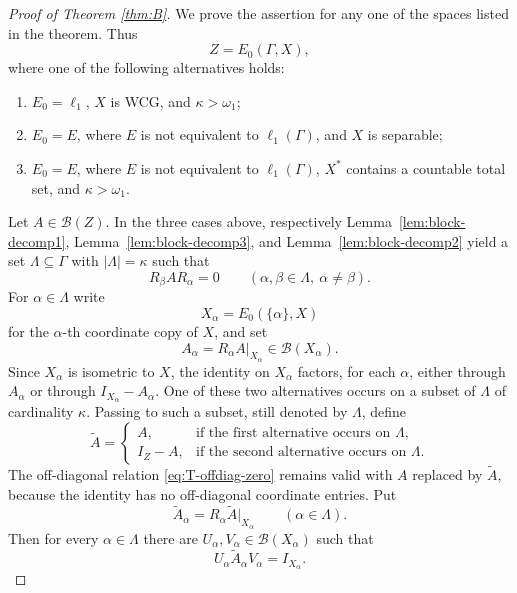 \documentclass[11pt]{amsart}
\theoremstyle{plain}
\theoremstyle{definition}
\numberwithin{equation}{section}
\newcommand{\abs}[1]{\left|#1\right|}
\newcommand{\Bop}{\mathcal{B}}
\begin{document}
\begin{proof}[Proof of Theorem \ref{thm:B}]
We prove the assertion for any one of the spaces listed in the theorem.  Thus
\[
    Z=E_0(\Gamma,X),
\]
where one of the following alternatives holds:
\begin{enumerate}[label=\textup{(\alph*)}]
    \item $E_0=\ell_1$, $X$ is WCG, and $\kappa>\omega_1$;
    \item $E_0=E$, where $E$ is not equivalent to $\ell_1(\Gamma)$, and $X$ is separable;
    \item $E_0=E$, where $E$ is not equivalent to $\ell_1(\Gamma)$, $X^*$ contains a countable total set, and $\kappa>\omega_1$.
\end{enumerate}
Let $A\in\Bop(Z)$.  In the three cases above, respectively Lemma~\ref{lem:block-decomp1}, Lemma~\ref{lem:block-decomp3}, and Lemma~\ref{lem:block-decomp2} yield a set $\Lambda\subseteq\Gamma$ with $\abs{\Lambda}=\kappa$ such that
\begin{equation}\label{eq:T-offdiag-zero}
    R_\beta A R_\alpha=0
    \qquad(\alpha,\beta\in\Lambda,\ \alpha\neq\beta).
\end{equation}
For $\alpha\in\Lambda$ write
\[
    X_\alpha=E_0(\{\alpha\},X)
\]
for the $\alpha$-th coordinate copy of $X$, and set
\[
    A_\alpha=R_\alpha A|_{X_\alpha}\in\Bop(X_\alpha).
\]
Since $X_\alpha$ is isometric to $X$, the identity on $X_\alpha$ factors, for each $\alpha$, either through $A_\alpha$ or through $I_{X_\alpha}-A_\alpha$.  One of these two alternatives occurs on a subset of $\Lambda$ of cardinality $\kappa$.  Passing to such a subset, still denoted by $\Lambda$, define
\[
    \widetilde A=
    \begin{cases}
        A, & \text{if the first alternative occurs on }\Lambda,\\
        I_Z-A, & \text{if the second alternative occurs on }\Lambda.
    \end{cases}
\]
The off-diagonal relation \eqref{eq:T-offdiag-zero} remains valid with $A$ replaced by $\widetilde A$, because the identity has no off-diagonal coordinate entries.  Put
\[
    \widetilde A_\alpha=R_\alpha\widetilde A|_{X_\alpha}\qquad(\alpha\in\Lambda).
\]
Then for every $\alpha\in\Lambda$ there are $U_\alpha,V_\alpha\in\Bop(X_\alpha)$ such that
\begin{equation}\label{eq:coordinate-factorisation}
    U_\alpha \widetilde A_\alpha V_\alpha=I_{X_\alpha}.
\end{equation}


\end{proof}
\end{document}
